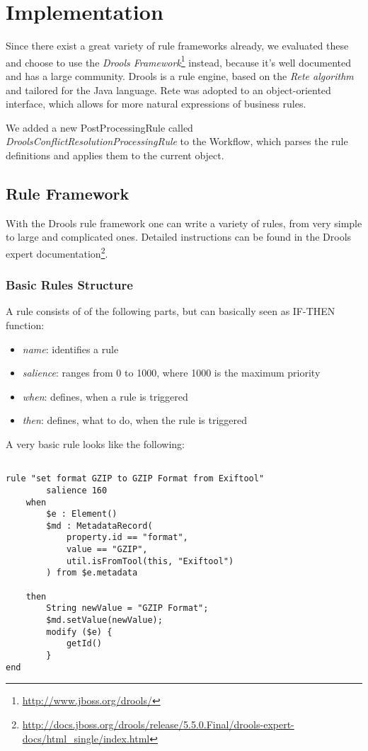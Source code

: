 \documentclass[a4paper,12pt]{article}
\begin{document}
\section{Implementation}

Since there exist a great variety of rule frameworks already, we evaluated these and choose to use the \emph{Drools Framework}\footnote{\url{http://www.jboss.org/drools/}} instead, because it's well documented and has a large community.
Drools is a rule engine, based on the \emph{Rete algorithm} and tailored for the Java language. Rete was adopted to an object-oriented interface, which allows for more natural expressions of business rules.

We added a new PostProcessingRule called \emph{DroolsConflictResolutionProcessingRule} to the Workflow, which parses the rule definitions and applies them to the current object.

\subsection{Rule Framework}

With the Drools rule framework one can write a variety of rules, from very simple to large and complicated ones. Detailed instructions can be found in the Drools expert documentation\footnote{\url{http://docs.jboss.org/drools/release/5.5.0.Final/drools-expert-docs/html_single/index.html}}.

\subsubsection{Basic Rules Structure}

A rule consists of of the following parts, but can basically seen as IF-THEN function:
\begin{itemize}
\item \emph{name}: identifies a rule
\item \emph{salience}: ranges from 0 to 1000, where 1000 is the maximum priority
\item \emph{when}: defines, when a rule is triggered
\item \emph{then}: defines, what to do, when the rule is triggered
\end{itemize}


A very basic rule looks like the following:
\begin{lstlisting}

rule "set format GZIP to GZIP Format from Exiftool"
        salience 160
    when 
        $e : Element()
        $md : MetadataRecord(
            property.id == "format", 
            value == "GZIP",
            util.isFromTool(this, "Exiftool")
        ) from $e.metadata

    then
        String newValue = "GZIP Format";
        $md.setValue(newValue);
        modify ($e) {
            getId()
        }
end
\end{lstlisting}
\end{document}
